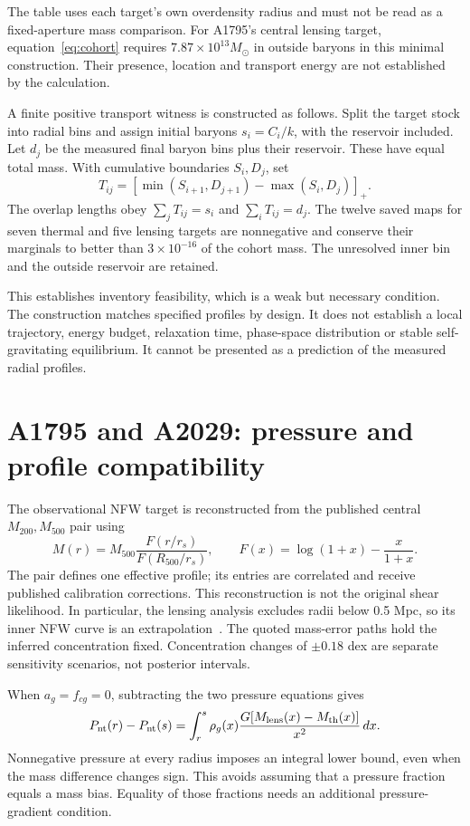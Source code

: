 \documentclass[11pt]{article}
\begin{document}
The table uses each target's own overdensity radius and must not be read as a fixed-aperture mass comparison. For A1795's central lensing target, equation~\eqref{eq:cohort} requires $7.87\times10^{13}M_\odot$ in outside baryons in this minimal construction. Their presence, location and transport energy are not established by the calculation.

A finite positive transport witness is constructed as follows. Split the target stock into radial bins and assign initial baryons $s_i=C_i/k$, with the reservoir included. Let $d_j$ be the measured final baryon bins plus their reservoir. These have equal total mass. With cumulative boundaries $S_i,D_j$, set
\[
T_{ij}=\left[\min(S_{i+1},D_{j+1})-\max(S_i,D_j)\right]_+.
\]
The overlap lengths obey $\sum_jT_{ij}=s_i$ and $\sum_iT_{ij}=d_j$. The twelve saved maps for seven thermal and five lensing targets are nonnegative and conserve their marginals to better than $3\times10^{-16}$ of the cohort mass. The unresolved inner bin and the outside reservoir are retained.

This establishes inventory feasibility, which is a weak but necessary condition. The construction matches specified profiles by design. It does not establish a local trajectory, energy budget, relaxation time, phase-space distribution or stable self-gravitating equilibrium. It cannot be presented as a prediction of the measured radial profiles.

\clearpage
\section{A1795 and A2029: pressure and profile compatibility}
The observational NFW target is reconstructed from the published central $M_{200},M_{500}$ pair using
\[
M(r)=M_{500}\frac{F(r/r_s)}{F(R_{500}/r_s)},\qquad
F(x)=\log(1+x)-\frac{x}{1+x}.
\]
The pair defines one effective profile; its entries are correlated and receive published calibration corrections. This reconstruction is not the original shear likelihood. In particular, the lensing analysis excludes radii below 0.5 Mpc, so its inner NFW curve is an extrapolation~\cite{herbonnet}. The quoted mass-error paths hold the inferred concentration fixed. Concentration changes of $\pm0.18$ dex are separate sensitivity scenarios, not posterior intervals.

When $a_g=f_{cg}=0$, subtracting the two pressure equations gives
\begin{equation}
P_{\rm nt}(r)-P_{\rm nt}(s)=
\int_r^s \rho_g(x)\frac{G[M_{\rm lens}(x)-M_{\rm th}(x)]}{x^2}\,dx.
\label{eq:pressure}
\end{equation}
Nonnegative pressure at every radius imposes an integral lower bound, even when the mass difference changes sign. This avoids assuming that a pressure fraction equals a mass bias. Equality of those fractions needs an additional pressure-gradient condition.
\end{document}
